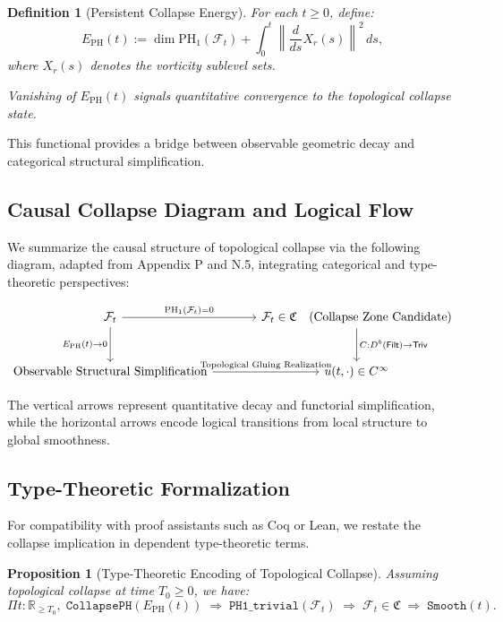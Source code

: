 \documentclass[11pt]{article}
\newtheorem{definition}[theorem]{Definition}
\newtheorem{proposition}[theorem]{Proposition}
\begin{document}
\begin{definition}[Persistent Collapse Energy]
For each \( t \geq 0 \), define:
\[
E_{\mathrm{PH}}(t) := \dim \mathrm{PH}_1(\mathcal{F}_t) + \int_0^t \left\| \frac{d}{ds} X_r(s) \right\|^2 \, ds,
\]
where \( X_r(s) \) denotes the vorticity sublevel sets.

Vanishing of \( E_{\mathrm{PH}}(t) \) signals quantitative convergence to the topological collapse state.
\end{definition}

This functional provides a bridge between observable geometric decay and categorical structural simplification.

\subsection{Causal Collapse Diagram and Logical Flow}

We summarize the causal structure of topological collapse via the following diagram, adapted from Appendix P and N.5, integrating categorical and type-theoretic perspectives:

\[
\begin{tikzcd}[row sep=large, column sep=large]
\mathcal{F}_t
  \arrow[r, "{\mathrm{PH}_1(\mathcal{F}_t) = 0}"]
  \arrow[d, "{E_{\mathrm{PH}}(t) \to 0}"']
& \mathcal{F}_t \in \mathfrak{C} \quad \text{(Collapse Zone Candidate)}
  \arrow[d, "{C : D^b(\mathsf{Filt}) \to \mathsf{Triv}}"] \\
\text{Observable Structural Simplification}
  \arrow[r, "{\text{Topological Gluing Realization}}"]
& u(t, \cdot) \in C^\infty
\end{tikzcd}
\]

The vertical arrows represent quantitative decay and functorial simplification, while the horizontal arrows encode logical transitions from local structure to global smoothness.

\subsection{Type-Theoretic Formalization}

For compatibility with proof assistants such as Coq or Lean, we restate the collapse implication in dependent type-theoretic terms.

\begin{proposition}[Type-Theoretic Encoding of Topological Collapse]
Assuming topological collapse at time \( T_0 \geq 0 \), we have:
\[
\Pi t : \mathbb{R}_{\geq T_0},\;
\texttt{CollapsePH}(E_{\mathrm{PH}}(t)) \;\Rightarrow\;
\texttt{PH1\_trivial}(\mathcal{F}_t) \;\Rightarrow\;
\mathcal{F}_t \in \mathfrak{C} \;\Rightarrow\;
\texttt{Smooth}(t).
\]
\end{proposition}
\end{document}

